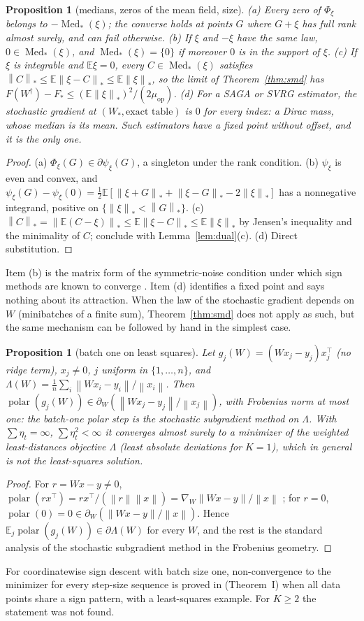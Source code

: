 \documentclass[11pt]{article}
\newtheorem{proposition}[theorem]{Proposition}
\newcommand{\E}{\mathbb{E}}
\newcommand{\norm}[1]{\left\|#1\right\|}
\newcommand{\nnuc}[1]{\left\|#1\right\|_{*}}
\newcommand{\polar}{\operatorname{polar}}
\newcommand{\Med}{\operatorname{Med}_\ast}
\newcommand{\muop}{\mu_{\mathrm{op}}}
\begin{document}
\begin{proposition}[medians, zeros of the mean field, size]\label{prop:median}
(a) Every zero of $\Phi_\xi$ belongs to $-\Med(\xi)$; the converse holds at points $G$ where $G+\xi$ has full rank
almost surely, and can fail otherwise.
(b) If $\xi$ and $-\xi$ have the same law, $0\in\Med(\xi)$, and $\Med(\xi)=\{0\}$ if moreover $0$ is in the support
of $\xi$.
(c) If $\xi$ is integrable and $\E\xi=0$, every $C\in\Med(\xi)$ satisfies $\nnuc C\le\E\nnuc{\xi-C}\le\E\nnuc\xi$, so
the limit of Theorem~\ref{thm:smd} has $F(W^\dagger)-F_\ast\le(\E\nnuc\xi)^2/(2\muop)$.
(d) For a SAGA or SVRG estimator, the stochastic gradient at $(W_\ast,\text{exact table})$ is $0$ for every index: a
Dirac mass, whose median is its mean. Such estimators have a fixed point without offset, and it is the only one.
\end{proposition}
\begin{proof}
(a) $\Phi_\xi(G)\in\partial\psi_\xi(G)$, a singleton under the rank condition. (b) $\psi_\xi$ is even and convex, and
$\psi_\xi(G)-\psi_\xi(0)=\frac12\E[\nnuc{\xi+G}+\nnuc{\xi-G}-2\nnuc\xi]$ has a nonnegative integrand, positive on
$\{\nnuc\xi<\nnuc G\}$. (c) $\nnuc C=\nnuc{\E(C-\xi)}\le\E\nnuc{\xi-C}\le\E\nnuc\xi$ by Jensen's inequality and the
minimality of $C$; conclude with Lemma~\ref{lem:dual}(c). (d) Direct substitution.
\end{proof}
Item (b) is the matrix form of the symmetric-noise condition under which sign methods are known to converge
\cite{bernstein2019majority}. Item (d) identifies a fixed point and says nothing about its attraction. When the law
of the stochastic gradient depends on $W$ (minibatches of a finite sum), Theorem~\ref{thm:smd} does not apply as such,
but the same mechanism can be followed by hand in the simplest case.

\begin{proposition}[batch one on least squares]\label{prop:lad}
Let $g_j(W)=(Wx_j-y_j)x_j^\top$ (no ridge term), $x_j\ne0$, $j$ uniform in $\{1,\dots,n\}$, and
$\Lambda(W)=\frac1n\sum_i\norm{Wx_i-y_i}/\norm{x_i}$. Then $\polar(g_j(W))\in\partial_W(\norm{Wx_j-y_j}/\norm{x_j})$,
with Frobenius norm at most one: the batch-one polar step is the stochastic subgradient method on $\Lambda$. With
$\sum\eta_t=\infty$, $\sum\eta_t^2<\infty$ it converges almost surely to a minimizer of the weighted least-distances
objective $\Lambda$ (least absolute deviations for $K=1$), which in general is not the least-squares solution.
\end{proposition}
\begin{proof}
For $r=Wx-y\ne0$, $\polar(rx^\top)=rx^\top/(\norm r\norm x)=\nabla_W\norm{Wx-y}/\norm x$
\cite[Lemma~H.1]{li2026implicit}; for $r=0$, $\polar(0)=0\in\partial_W(\norm{Wx-y}/\norm x)$. Hence
$\E_j\polar(g_j(W))\in\partial\Lambda(W)$ for every $W$, and the rest is the standard analysis of the stochastic
subgradient method in the Frobenius geometry.
\end{proof}
For coordinatewise sign descent with batch size one, non-convergence to the minimizer for every step-size sequence is
proved in \cite{karimireddy2019error} (Theorem~I) when all data points share a sign pattern, with a least-squares
example. For $K\ge2$ the statement was not found.
\end{document}
